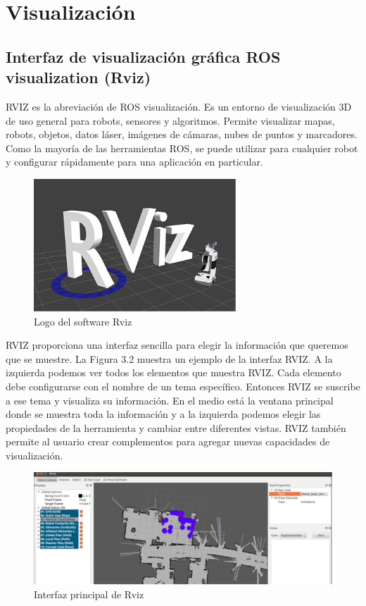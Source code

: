    \newpage    


\section{Visualización}
    
    \subsection{Interfaz de visualización gráfica ROS visualization (Rviz)}

        RVIZ es la abreviación de ROS visualización. Es un entorno de visualización 3D de uso general para robots, sensores y algoritmos. Permite visualizar mapas, robots, objetos, datos láser, imágenes de cámaras, nubes de puntos y marcadores.   Como la mayoría de las herramientas ROS, se puede utilizar para cualquier robot y configurar rápidamente para una aplicación en particular.
        
        \begin{figure}[htb]
            \centering
            \includegraphics[width=0.5\linewidth]{Main/Chapter3/Images3/3-6/logo-rviz.png}
            \caption{Logo del software Rviz}
            \label{f:Cap3-6_logo_rviz}
        \end{figure}
        
        RVIZ proporciona una interfaz sencilla para elegir la información que queremos que se muestre. La Figura 3.2 muestra un ejemplo de la interfaz RVIZ. A la izquierda podemos ver todos los elementos que muestra RVIZ. Cada elemento debe configurarse con el nombre de un tema específico. Entonces RVIZ se suscribe a ese tema y visualiza su información. En el medio está la ventana principal donde se muestra toda la información y a la izquierda podemos elegir las propiedades de la herramienta y cambiar entre diferentes vistas. RVIZ también permite al usuario crear complementos para agregar nuevas capacidades de visualización.
        
        \begin{figure}[htb]
            \centering
            \includegraphics[width=0.8\linewidth]{Main/Chapter3/Images3/3-6/interfaz-rviz.png}
            \caption{Interfaz principal de Rviz}
            \label{f:Cap3-6_interfaz_rviz}
        \end{figure}
    
